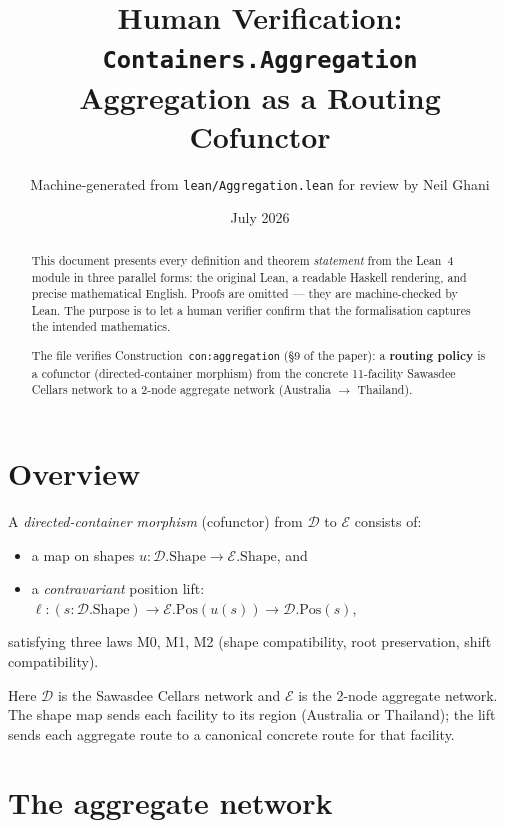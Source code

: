 \documentclass[11pt,a4paper]{article}
\title{Human Verification: \texttt{Containers.Aggregation}\\[4pt]
  \large Aggregation as a Routing Cofunctor}
\author{Machine-generated from \texttt{lean/Aggregation.lean} for review by Neil Ghani}
\date{July 2026}
\begin{document}
\maketitle

\begin{abstract}
This document presents every definition and theorem \emph{statement} from the
Lean~4 module  in three parallel forms: the
original Lean, a readable Haskell rendering, and precise mathematical English.
Proofs are omitted --- they are machine-checked by Lean.  The purpose is to
let a human verifier confirm that the formalisation captures the intended
mathematics.

The file verifies Construction~\texttt{con:aggregation} (\S9 of the paper): a
\textbf{routing policy} is a cofunctor (directed-container morphism) from the
concrete 11-facility Sawasdee Cellars network to a 2-node aggregate network
(Australia $\to$ Thailand).
\end{abstract}

\tableofcontents
\bigskip

\section{Overview}

A \emph{directed-container morphism} (cofunctor) from $\mathcal{D}$ to
$\mathcal{E}$ consists of:
\begin{itemize}
  \item a map on shapes $u : \mathcal{D}.\mathrm{Shape} \to \mathcal{E}.\mathrm{Shape}$, and
  \item a \emph{contravariant} position lift:
    $\ell : (s : \mathcal{D}.\mathrm{Shape}) \to \mathcal{E}.\mathrm{Pos}(u(s)) \to \mathcal{D}.\mathrm{Pos}(s)$,
\end{itemize}
satisfying three laws M0, M1, M2 (shape compatibility, root preservation, shift
compatibility).

Here $\mathcal{D}$ is the Sawasdee Cellars network and $\mathcal{E}$ is the
2-node aggregate network.  The shape map sends each facility to its region
(Australia or Thailand); the lift sends each aggregate route to a canonical
concrete route for that facility.


\section{The aggregate network}
\end{document}
